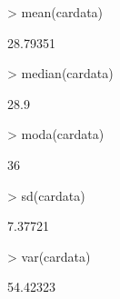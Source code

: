 \documentclass [a4paper] {article}
\begin{document}
\begin{Schunk}
\end{Schunk}

\begin{Schunk}
\begin{Sinput}
> mean(cardata)
\end{Sinput}
\begin{Soutput}
[1] 28.79351
\end{Soutput}
\begin{Sinput}
> median(cardata)
\end{Sinput}
\begin{Soutput}
[1] 28.9
\end{Soutput}
\begin{Sinput}
> moda(cardata)
\end{Sinput}
\begin{Soutput}
[1] 36
\end{Soutput}
\begin{Sinput}
> sd(cardata)
\end{Sinput}
\begin{Soutput}
[1] 7.37721
\end{Soutput}
\begin{Sinput}
> var(cardata)
\end{Sinput}
\begin{Soutput}
[1] 54.42323
\end{Soutput}
\end{Schunk}
\end{document}

